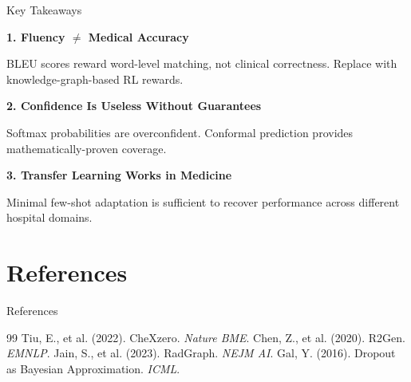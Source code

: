 \documentclass[aspectratio=169]{beamer}
\begin{document}
\begin{frame}{Key Takeaways}
  
  \begin{center}
    \Large
    
    \textbf{1. Fluency $\neq$ Medical Accuracy}
    
    \vspace{0.3cm}
    
    \normalsize
    BLEU scores reward word-level matching, not clinical correctness. Replace with knowledge-graph-based RL rewards.
    
    \vspace{0.5cm}
    
    \Large
    \textbf{2. Confidence Is Useless Without Guarantees}
    
    \vspace{0.3cm}
    
    \normalsize
    Softmax probabilities are overconfident. Conformal prediction provides mathematically-proven coverage.
    
    \vspace{0.5cm}
    
    \Large
    \textbf{3. Transfer Learning Works in Medicine}
    
    \vspace{0.3cm}
    
    \normalsize
    Minimal few-shot adaptation is sufficient to recover performance across different hospital domains.
    
  \end{center}
  
\end{frame}

\section{References}
\begin{frame}[allowframebreaks]{References}
  \scriptsize
  
  \begin{thebibliography}{99}
   Tiu, E., et al. (2022). CheXzero. \emph{Nature BME}.
   Chen, Z., et al. (2020). R2Gen. \emph{EMNLP}.
   Jain, S., et al. (2023). RadGraph. \emph{NEJM AI}.
   Gal, Y. (2016). Dropout as Bayesian Approximation. \emph{ICML}.
  \end{thebibliography}
\end{frame}
\end{document}
